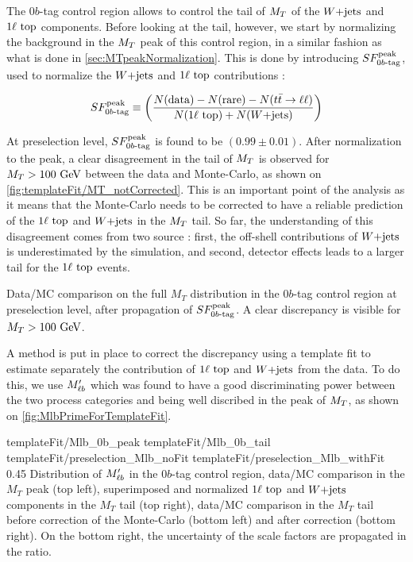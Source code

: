         The $0b$-tag control region allows to control the tail of $M_T$ of the $\text{$W$+jets}$ and $1\ell~\text{top}$ components. Before looking at the tail, however, we start by normalizing the background in the $M_T$ peak of this control region, in a similar fashion as what is done in \ref{sec:MTpeakNormalization}. This is done by introducing $SF_{0b\text{-tag}}^{\text{peak}}$, used to normalize the $\text{$W$+jets}$ and $1\ell~\text{top}$ contributions :

        \begin{equation}
            SF_{0b\text{-tag}}^{\text{peak}} \equiv \left( \frac{N(\text{data}) - N(\text{rare}) - N(t\bar{t} \rightarrow \ell \ell)}{N(1\ell~\text{top}) + N(\text{$W$+jets})} \right)
            \label{eq:SF0btagDefinition}
        \end{equation}

        At preselection level, $SF_{0b\text{-tag}}^{\text{peak}}$ is found to be $(0.99 \pm 0.01)$. After normalization to the peak, a clear disagreement in the tail of $M_T$ is observed for $M_T > 100 ~\text{GeV}$ between the data and Monte-Carlo, as shown on \ref{fig:templateFit/MT_notCorrected}. This is an important point of the analysis as it means that the Monte-Carlo needs to be corrected to have a reliable prediction of the $1\ell~\text{top}$ and $\text{$W$+jets}$ in the $M_T$ tail. So far, the understanding of this disagreement comes from two source : first, the off-shell contributions of $\text{$W$+jets}$ is underestimated by the simulation, and second, detector effects leads to a larger tail for the $1\ell~\text{top}$ events.

                     {Data/MC comparison on the full $M_T$ distribution in the $0b$-tag control region at preselection level, after propagation of $SF_{0b\text{-tag}}^{\text{peak}}$. A clear discrepancy is visible for $M_T > 100 ~\text{GeV}$.}

        A method is put in place to correct the discrepancy using a template fit to estimate separately the contribution of $1\ell~\text{top}$ and $\text{$W$+jets}$ from the data. To do this, we use $M'_{\ell b}$ which was found to have a good discriminating power between the two process categories and being well discribed in the peak of $M_T$, as shown on \ref{fig:MlbPrimeForTemplateFit}.

                          {templateFit/Mlb_0b_peak}
                          {templateFit/Mlb_0b_tail}
                          {templateFit/preselection_Mlb_noFit}
                          {templateFit/preselection_Mlb_withFit}
                          {0.45}
                          {Distribution of $M'_{\ell b}$ in the $0b$-tag control region, data/MC comparison in the $M_T$ peak (top left), superimposed and normalized $1\ell~\text{top}$ and $\text{$W$+jets}$ components in the $M_T$ tail (top right), data/MC comparison in the $M_T$ tail before correction of the Monte-Carlo (bottom left) and after correction (bottom right). On the bottom right, the uncertainty of the scale factors are propagated in the ratio.}


